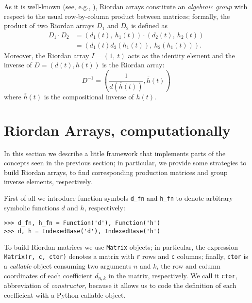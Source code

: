 As it is well-known (see, e.g., \citep{LUZON201475,MRSV97,SHAPIRO1991229}),
Riordan arrays constitute an \textit{algebraic group} with respect to the usual
row-by-column product between matrices; formally, the product of two Riordan
arrays $D_1$ and $D_2$ is defined as
\begin{displaymath}
\begin{split}
  D_1 \cdot D_2 &= (d_1(t),\ h_1(t)) \cdot (d_2(t),\ h_2(t)) \\
                &=(d_1(t)d_2(h_1(t)),\ h_2(h_1(t))).
\end{split}
\end{displaymath}
Moreover, the Riordan array $I = (1,\ t)$ acts as the identity element and the
inverse of $D =(d(t), h(t))$ is the Riordan array:
$$
D^{-1} = \left( \frac{1}{d(\overline{h}(t))},
  \overline{h}(t) \right)
$$
where $\overline{h}(t)$ is the compositional inverse of $h(t)$.

\section{Riordan Arrays, computationally}

In this section we describe a little framework that implements parts
of the concepts seen in the previous section; in particular, we provide
some strategies to build Riordan arrays, to find corresponding production
matrices and group inverse elements, respectively.

First of all we introduce function symbols \verb|d_fn| and \verb|h_fn|
to denote arbitrary symbolic functions $d$ and $h$, respectively:
\begin{verbatim}
>>> d_fn, h_fn = Function('d'), Function('h')
>>> d, h = IndexedBase('d'), IndexedBase('h')
\end{verbatim}

To build Riordan matrices we use \verb|Matrix| objects; in particular, the
expression \verb|Matrix(r, c, ctor)| denotes a matrix with \verb|r| rows and
\verb|c| columns; finally, \verb|ctor| is a \textit{callable} object consuming
two arguments $n$ and $k$, the row and column coordinates of each coefficient
$d_{n,k}$ in the matrix, respectively. We call it \verb|ctor|, abbreviation of
\textit{constructor}, because it allows us to code the definition of each
coefficient with a Python callable object.

